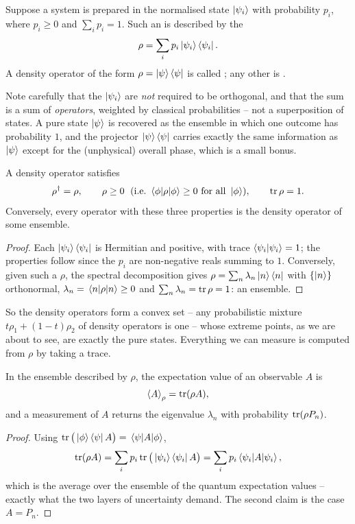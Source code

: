 \documentclass[a4paper]{scrartcl}
\begin{document}
\begin{definition}
    Suppose a system is prepared in the normalised state $\ket{\psi_i}$ with probability $p_i$, where $p_i \geq 0$ and $\sum_i p_i = 1$. Such an  is described by the 
    $$
    \rho = \sum_i p_i \ket{\psi_i}\bra{\psi_i}.
    $$
    A density operator of the form $\rho = \ket\psi\bra\psi$ is called ; any other is .
\end{definition}

Note carefully that the $\ket{\psi_i}$ are \emph{not} required to be orthogonal, and that the sum is a sum of \emph{operators}, weighted by classical probabilities -- not a superposition of states. A pure state $\ket\psi$ is recovered as the ensemble in which one outcome has probability $1$, and the projector $\ket\psi\bra\psi$ carries exactly the same information as $\ket\psi$ except for the (unphysical) overall phase, which is a small bonus.

\begin{proposition}
    A density operator satisfies
    $$
    \rho^\dagger = \rho, \qquad \rho \geq 0 \; \text{ (i.e.\ } \mel{\phi}{\rho}{\phi}\geq0 \text{ for all } \ket\phi), \qquad \tr \rho = 1.
    $$
    Conversely, every operator with these three properties is the density operator of some ensemble.
\end{proposition}
\begin{proof}
    Each $\ket{\psi_i}\bra{\psi_i}$ is Hermitian and positive, with trace $\braket{\psi_i}{\psi_i} = 1$; the properties follow since the $p_i$ are non-negative reals summing to $1$. Conversely, given such a $\rho$, the spectral decomposition gives $\rho = \sum_n \lambda_n \ket{n}\bra{n}$ with $\{\ket n\}$ orthonormal, $\lambda_n = \mel{n}{\rho}{n}\geq0$ and $\sum_n\lambda_n = \tr\rho = 1$: an ensemble.
\end{proof}

So the density operators form a convex set -- any probabilistic mixture $t\rho_1 + (1-t)\rho_2$ of density operators is one -- whose extreme points, as we are about to see, are exactly the pure states. Everything we can measure is computed from $\rho$ by taking a trace.

\begin{proposition}
    In the ensemble described by $\rho$, the expectation value of an observable $A$ is
    $$
    \expval{A}_\rho = \tr(\rho A),
    $$
    and a measurement of $A$ returns the eigenvalue $\lambda_n$ with probability $\tr(\rho P_n)$.
\end{proposition}
\begin{proof}
    Using $\tr\big(\ket\phi\bra\psi A\big) = \mel{\psi}{A}{\phi}$,
    $$
    \tr(\rho A) = \sum_i p_i \tr\big( \ket{\psi_i}\bra{\psi_i}A \big) = \sum_i p_i \mel{\psi_i}{A}{\psi_i},
    $$
    which is the average over the ensemble of the quantum expectation values -- exactly what the two layers of uncertainty demand. The second claim is the case $A = P_n$.
\end{proof}
\end{document}
